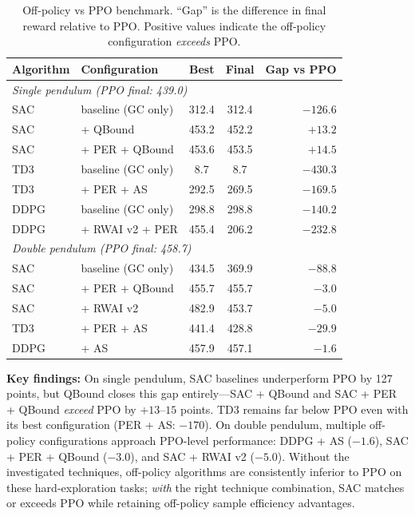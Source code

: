 \documentclass[11pt,a4paper]{article}
\begin{document}
\begin{table}[h]
\centering
\caption{Off-policy vs PPO benchmark. ``Gap'' is the difference in final reward relative to PPO. Positive values indicate the off-policy configuration \emph{exceeds} PPO.}
\small
\begin{tabular}{llccr}
\toprule
Algorithm & Configuration & Best & Final & Gap vs PPO \\
\midrule
\multicolumn{5}{l}{\emph{Single pendulum (PPO final: 439.0)}} \\
SAC & baseline (GC only) & 312.4 & 312.4 & $-126.6$ \\
SAC & + QBound & 453.2 & 452.2 & $\mathbf{+13.2}$ \\
SAC & + PER + QBound & 453.6 & 453.5 & $\mathbf{+14.5}$ \\
TD3 & baseline (GC only) & 8.7 & 8.7 & $-430.3$ \\
TD3 & + PER + AS & 292.5 & 269.5 & $-169.5$ \\
DDPG & baseline (GC only) & 298.8 & 298.8 & $-140.2$ \\
DDPG & + RWAI v2 + PER & 455.4 & 206.2 & $-232.8$ \\
\midrule
\multicolumn{5}{l}{\emph{Double pendulum (PPO final: 458.7)}} \\
SAC & baseline (GC only) & 434.5 & 369.9 & $-88.8$ \\
SAC & + PER + QBound & 455.7 & 455.7 & $-3.0$ \\
SAC & + RWAI v2 & 482.9 & 453.7 & $-5.0$ \\
TD3 & + PER + AS & 441.4 & 428.8 & $-29.9$ \\
DDPG & + AS & 457.9 & 457.1 & $-1.6$ \\
\bottomrule
\end{tabular}
\label{tab:ppo_gap}
\end{table}

\textbf{Key findings:} On single pendulum, SAC baselines underperform PPO by 127 points, but QBound closes this gap entirely---SAC + QBound and SAC + PER + QBound \emph{exceed} PPO by $+13$--$15$ points. TD3 remains far below PPO even with its best configuration (PER + AS: $-170$). On double pendulum, multiple off-policy configurations approach PPO-level performance: DDPG + AS ($-1.6$), SAC + PER + QBound ($-3.0$), and SAC + RWAI v2 ($-5.0$). Without the investigated techniques, off-policy algorithms are consistently inferior to PPO on these hard-exploration tasks; \emph{with} the right technique combination, SAC matches or exceeds PPO while retaining off-policy sample efficiency advantages.
\end{document}
